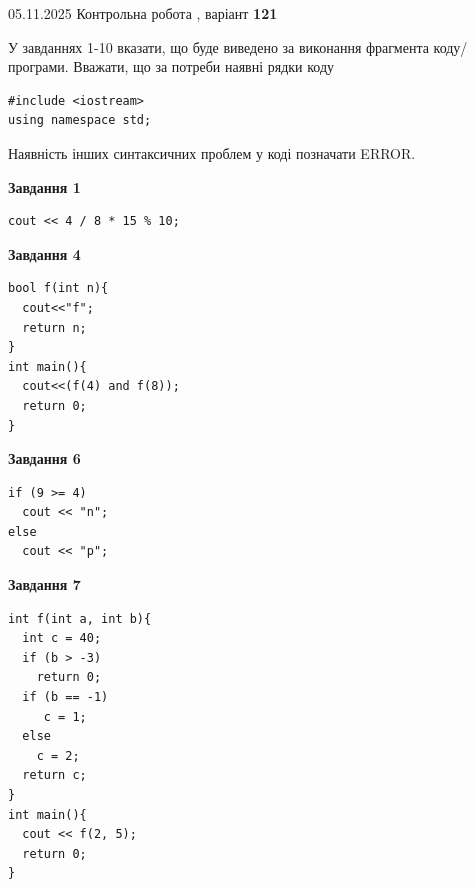 \documentclass[12pt, ukrainian]{article}
\begin{document}
{\Large{05.11.2025 Контрольна робота , варіант  \No \textbf { 121 }\par}}
{
\begin {large}
У завданнях 1-10 вказати, що буде виведено за виконання фрагмента коду/про\-гра\-ми.
Вважати, що за потреби наявні рядки коду
\begin{verbatim}
#include <iostream>
using namespace std;
\end{verbatim}
Наявність інших синтаксичних проблем у коді позначати ERROR.

\begin{minipage}[t]{7.0cm}

\begin{center}
\textbf{Завдання 1}
\end{center}
\vspace{-8mm}

\begin{verbatim}
cout << 4 / 8 * 15 % 10;
\end{verbatim}



\begin{center}
\textbf{Завдання 4}
\end{center}
\vspace{-8mm}

\begin{verbatim}
bool f(int n){
  cout<<"f";
  return n;
}
int main(){
  cout<<(f(4) and f(8));
  return 0;
}
\end{verbatim}



\begin{center}
\textbf{Завдання 6}
\end{center}
\vspace{-8mm}

\begin{verbatim}
if (9 >= 4)
  cout << "n";
else
  cout << "p";
\end{verbatim}



\begin{center}
\textbf{Завдання 7}
\end{center}
\vspace{-8mm}

\begin{verbatim}
int f(int a, int b){
  int c = 40;
  if (b > -3)
    return 0;
  if (b == -1)
     c = 1;
  else
    c = 2;
  return c;
}
int main(){
  cout << f(2, 5);
  return 0;
}
\end{verbatim}


\end{minipage}
\end{large}}
\end{document}
